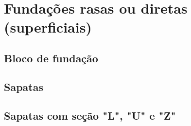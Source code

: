 \documentclass[12pt, a4paper]{article}
\begin{document}
	

	\section{Fundações rasas ou diretas (superficiais)}

		\subsection{Bloco de fundação}
		

		\subsection{Sapatas}
		

		\subsection{Sapatas com seção "L", "U" e "Z"}
		
\end{document}
